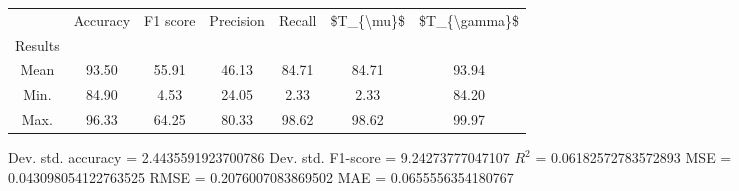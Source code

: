 \begin{tabular}{|c|c|c|c|c|c|c|}
\toprule
{} &  Accuracy &  F1 score &  Precision &  Recall &  \$T\_\{\textbackslash mu\}\$ &  \$T\_\{\textbackslash gamma\}\$ \\
Results &           &           &            &         &            &               \\
\hline
Mean    &     93.50 &     55.91 &      46.13 &   84.71 &      84.71 &         93.94 \\
Min.    &     84.90 &      4.53 &      24.05 &    2.33 &       2.33 &         84.20 \\
Max.    &     96.33 &     64.25 &      80.33 &   98.62 &      98.62 &         99.97 \\
\bottomrule
\end{tabular}

 Dev. std. accuracy = 2.4435591923700786
 Dev. std. F1-score = 9.24273777047107
 $R^2$ = 0.06182572783572893
 MSE = 0.043098054122763525
 RMSE = 0.2076007083869502
 MAE = 0.0655556354180767
